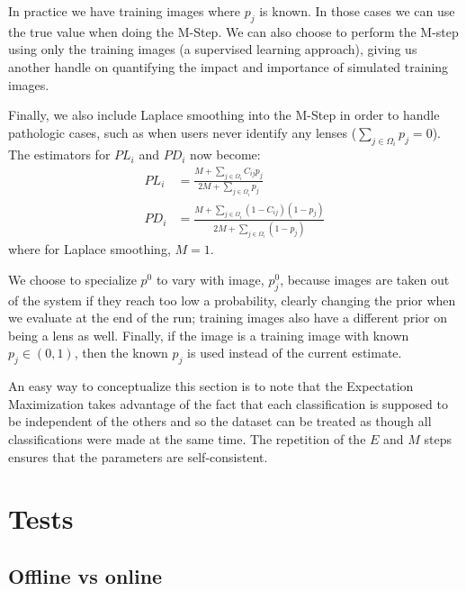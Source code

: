 \documentclass[useAMS,usenatbib,a4paper]{mn2e}
\begin{document}
In practice we have training images where $p_{j}$ is known. In those
cases we can use the true value when doing the M-Step. We can also choose to
perform the M-step using only the training images (a supervised learning
approach), giving us another handle on quantifying the impact and importance of
simulated training images.

Finally, we also include Laplace smoothing into the M-Step in order to handle
pathologic cases, such as when users never identify any lenses ($\sum_{j \in
\Omega_{i}} p_j = 0$). The estimators for $PL_{i}$ and $PD_{i}$ now become:
\begin{align}
  PL_{i} &= \frac{M + \sum_{j \in \Omega_i} C_{ij} p_{j}}{2M + \sum_{j \in
\Omega_i} p_{j}} \\
  PD_{i} &= \frac{M + \sum_{j \in \Omega_i} (1 - C_{ij}) (1 - p_{j})}{2M + \sum_{j \in
\Omega_i} (1 - p_{j})}
\end{align}
where for Laplace smoothing, $M = 1$.

We choose to specialize $p^{0}$ to vary with
image, $p_{j}^{0}$, because images are taken out of the \sw system if they reach
too low a probability, clearly changing the prior when we evaluate at the end
of the run; training images also have a
different prior on being a lens as well. Finally, if the image is a training
image with known $p_j \in (0,1)$, then the known $p_j$ is used instead of
the current estimate.

An easy way to conceptualize this section is to note that the Expectation
Maximization takes advantage of the fact that each classification is supposed
to be independent of the others and so the dataset can be treated as though all
classifications were made at the same time.  The repetition of the $E$ and $M$
steps ensures that the parameters are self-consistent.


\section{Tests}

\subsection{Offline vs online}

\end{document}
